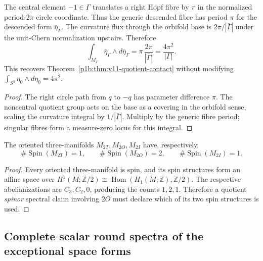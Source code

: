 \documentclass[11pt]{article}
\begin{document}
\begin{corollary}
\label{p1b:cor:v12-half-fibre}
The central element $-1\in\Gamma$ translates a right Hopf fibre by
$\pi$ in the normalized period-$2\pi$ circle coordinate.  Thus the
generic descended fibre has period $\pi$ for the descended form
$\bar\eta_\Gamma$.  The curvature flux through the orbifold base is
$2\pi/|\bar\Gamma|$ under the unit-Chern normalization upstairs.
Therefore
\[
  \int_{M_\Gamma}\bar\eta_\Gamma\wedge d\bar\eta_\Gamma
   =\pi\,\frac{2\pi}{|\bar\Gamma|}
   =\frac{4\pi^2}{|\Gamma|}.
\]
This recovers Theorem~\ref{p1b:thm:v11-quotient-contact} without
modifying $\int_{S^3}\eta_0\wedge d\eta_0=4\pi^2$.
\end{corollary}
\begin{proof}
The right circle path from $q$ to $-q$ has parameter difference
$\pi$.  The noncentral quotient group acts on the base as a covering
in the orbifold sense, scaling the curvature integral by
$1/|\bar\Gamma|$.  Multiply by the generic fibre period; singular
fibres form a measure-zero locus for this integral.
\end{proof}

\begin{corollary}
\label{p1b:cor:v12-spin-count}
The oriented three-manifolds $M_{2T},M_{2O},M_{2I}$ have, respectively,
\[
 \boxed{\#\operatorname{Spin}(M_{2T})=1,\qquad
 \#\operatorname{Spin}(M_{2O})=2,\qquad
 \#\operatorname{Spin}(M_{2I})=1.}
\]
\end{corollary}
\begin{proof}
Every oriented three-manifold is spin, and its spin structures form
an affine space over $H^1(M;\mathbb Z/2)\cong
\operatorname{Hom}(H_1(M;\mathbb Z),\mathbb Z/2)$.
The respective abelianizations are $C_3,C_2,0$, producing the counts
$1,2,1$.  Therefore a quotient \emph{spinor} spectral claim involving
$2O$ must declare which of its two spin structures is used.
\end{proof}

\subsection{Complete scalar round spectra of the exceptional space forms}
\label{p1b:subsec:v12-peter-weyl}
\end{document}
